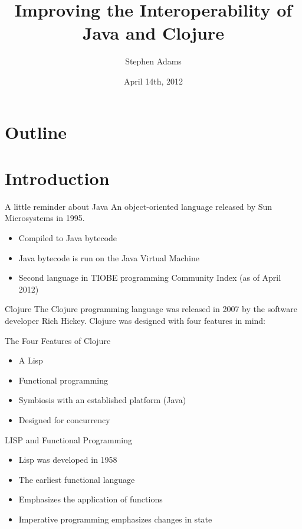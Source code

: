 \documentclass[xcolor=dvipsnames]{beamer}
\title{Improving the Interoperability of Java and Clojure}
\author{Stephen Adams}
\institute{University of Minnesota: Morris}
\date{April 14th, 2012}
\begin{document}
\begin{frame}
	\titlepage
\end{frame}

\section*{Outline}
	\section{Introduction}
	
	\begin{frame}{A little reminder about Java}
		An object-oriented language released by Sun Microsystems in 1995.
		\begin{itemize}
		\item Compiled to Java bytecode
		\item Java bytecode is run on the Java Virtual Machine
		\item Second language in TIOBE programming Community Index (as of April 2012)
		\end{itemize}
	\end{frame}
		
	\begin{frame}{Clojure}
		The Clojure programming language was released in 2007 by the software developer Rich Hickey. Clojure was designed with four features in mind:
		\pause
		\begin{block}{The Four Features of Clojure}
		\begin{itemize}
			\item A Lisp
			\item Functional programming
			\item Symbiosis with an established platform (Java)
			\item Designed for concurrency
		\end{itemize}
		\end{block}
	\end{frame}
	
	\begin{frame}{LISP and Functional Programming}
		\begin{itemize}
		\item Lisp was developed in 1958
		\item The earliest functional language
		\item Emphasizes the application of functions
		\item Imperative programming emphasizes changes in state
		\end{itemize}
	\end{frame}
	
\end{document}
